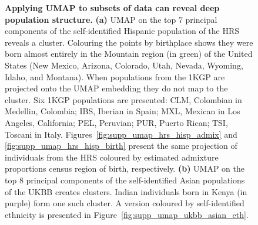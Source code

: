 \begin{figure}[ht]
\begin{subfigure}{0.49\columnwidth}
    \caption{}
        \label{fig:umap_ukbb_indian}
    \end{subfigure}
    \caption[Applying UMAP to subsets of data can reveal deep population structure]{\textbf{Applying UMAP to subsets of data can reveal deep population structure.} \textbf{(a)} UMAP on the top $7$ principal components of the self-identified Hispanic population of the HRS reveals a cluster. Colouring the points by birthplace shows they were born almost entirely in the Mountain region (in green) of the United States (New Mexico, Arizona, Colorado, Utah, Nevada, Wyoming, Idaho, and Montana). When populations from the 1KGP are projected onto the UMAP embedding they do not map to the cluster. Six 1KGP populations are presented:
    CLM, Colombian in Medellin, Colombia;
    IBS, Iberian in Spain;
    MXL, Mexican in Los Angeles, California;
    PEL, Peruvian;
    PUR, Puerto Rican;
    TSI, Toscani in Italy. Figures~\ref{fig:supp_umap_hrs_hisp_admix} and \ref{fig:supp_umap_hrs_hisp_birth} present the same projection of individuals from the HRS coloured by estimated admixture proportions census region of birth, respectively. \textbf{(b)} UMAP on the top $8$ principal components of the self-identified Asian populations of the UKBB creates clusters. Indian individuals born in Kenya (in purple) form one such cluster. A version coloured by self-identified ethnicity is presented in Figure~\ref{fig:supp_umap_ukbb_asian_eth}.}
    \label{fig:fig2}
\end{figure}

\clearpage

